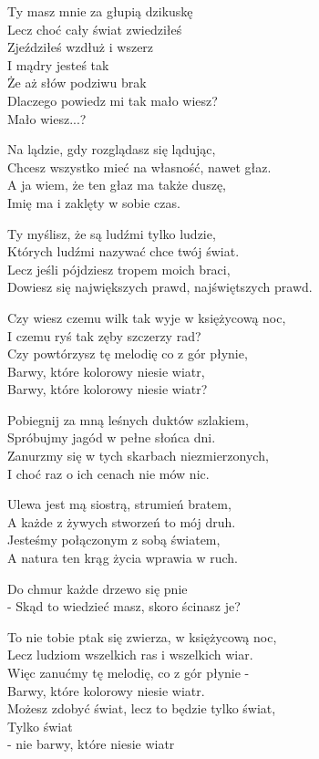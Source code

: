 \begin{text}
    Ty masz mnie za głupią dzikuskę\\
    Lecz choć cały świat zwiedziłeś\\
    Zjeździłeś wzdłuż i wszerz\\
    I mądry jesteś tak\\
    Że aż słów podziwu brak\\
    Dlaczego powiedz mi tak mało wiesz?\\
    Mało wiesz...?

    Na lądzie, gdy rozglądasz się lądując,\\
    Chcesz wszystko mieć na własność, nawet głaz.\\
    A ja wiem, że ten głaz ma także duszę,\\
    Imię ma i zaklęty w sobie czas.

    Ty myślisz, że są ludźmi tylko ludzie,\\
    Których ludźmi nazywać chce twój świat.\\
    Lecz jeśli pójdziesz tropem moich braci,\\
    Dowiesz się największych prawd, najświętszych prawd.

    Czy wiesz czemu wilk tak wyje w księżycową noc,\\
    I czemu ryś tak zęby szczerzy rad?\\
    Czy powtórzysz tę melodię co z gór płynie,\\
    Barwy, które kolorowy niesie wiatr,\\
    Barwy, które kolorowy niesie wiatr?

    Pobiegnij za mną leśnych duktów szlakiem,\\
    Spróbujmy jagód w pełne słońca dni.\\
    Zanurzmy się w tych skarbach niezmierzonych,\\
    I choć raz o ich cenach nie mów nic.

    Ulewa jest mą siostrą, strumień bratem,\\
    A każde z żywych stworzeń to mój druh.\\
    Jesteśmy połączonym z sobą światem,\\
    A natura ten krąg życia wprawia w ruch.

    Do chmur każde drzewo się pnie\\
    - Skąd to wiedzieć masz, skoro ścinasz je?

    To nie tobie ptak się zwierza, w księżycową noc,\\
    Lecz ludziom wszelkich ras i wszelkich wiar.\\
    Więc zanućmy tę melodię, co z gór płynie -\\
    Barwy, które kolorowy niesie wiatr.\\
    Możesz zdobyć świat, lecz to będzie tylko świat,\\
    Tylko świat\\
	- nie barwy, które niesie wiatr
\end{text}
